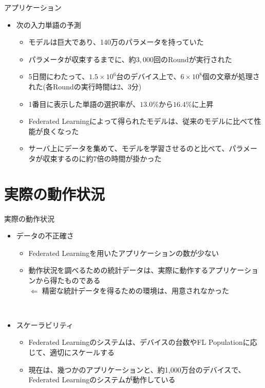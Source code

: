 \documentclass[dvipdfmx,notheorems,t]{beamer}
\begin{document}
\begin{frame}{アプリケーション}

\begin{itemize}
	\item 次の入力単語の予測
	\begin{itemize}
		\item モデルは巨大であり、140万のパラメータを持っていた
		\item パラメータが収束するまでに、約$3,000$回のRoundが実行された
		\item 5日間にわたって、$1.5 \times 10^6$台のデバイス上で、$6 \times 10^8$個の文章が処理された(各Roundの実行時間は2、3分)
		\newline
		
		\item 1番目に表示した単語の選択率が、$13.0\%$から$16.4\%$に上昇
		\item Federated Learningによって得られたモデルは、従来のモデルに比べて性能が良くなった
		\newline
		
		\item サーバ上にデータを集めて、モデルを学習させるのと比べて、パラメータが収束するのに約7倍の時間が掛かった
	\end{itemize}
\end{itemize}

\end{frame}

\section{実際の動作状況}

\begin{frame}{実際の動作状況}

\begin{itemize}
	\item データの不正確さ
	\begin{itemize}
		\item Federated Learningを用いたアプリケーションの数が少ない
		\item 動作状況を調べるための統計データは、実際に動作するアプリケーションから得たものである \\
		$\Leftarrow$ 精密な統計データを得るための環境は、用意されなかった
	\end{itemize} \
	
	\item スケーラビリティ
	\begin{itemize}
		\item Federated Learningのシステムは、デバイスの台数やFL Populationに応じて、適切にスケールする
		\item 現在は、幾つかのアプリケーションと、約1,000万台のデバイスで、Federated Learningのシステムが動作している
	\end{itemize}
\end{itemize}

\end{frame}
\end{document}
